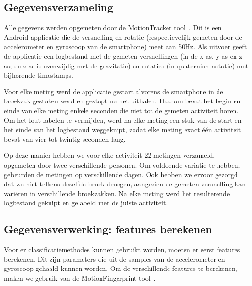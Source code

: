 \documentclass{article}
\begin{document}
\subsection{Gegevensverzameling}

Alle gegevens werden opgemeten door de MotionTracker tool~\cite{meert and schietgat:motiontracker}.
Dit is een Android-applicatie die de versnelling en rotatie (respectievelijk gemeten door de accelerometer en gyroscoop van de smartphone) meet aan 50Hz.  Als uitvoer geeft de applicatie een logbestand met de gemeten versnellingen (in de x-as, y-as en z-as; de z-as is evenwijdig met de gravitatie) en rotaties (in quaternion notatie) met bijhorende timestamps.

Voor elke meting werd de applicatie gestart alvorens de smartphone in de broekzak gestoken werd en gestopt na het uithalen. Daarom bevat het begin en einde van elke meting enkele seconden die niet tot de gemeten activiteit horen. Om het fout labelen te vermijden, werd na elke meting een stuk van de start en het einde van het logbestand weggeknipt, zodat elke meting exact \'e\'en activiteit bevat van vier tot twintig seconden lang. 

Op deze manier hebben we voor elke activiteit 22 metingen verzameld, opgemeten door twee verschillende personen. Om voldoende variatie te hebben, gebeurden de metingen op verschillende dagen. Ook hebben we ervoor gezorgd dat we niet telkens dezelfde broek droegen, aangezien de gemeten versnelling kan vari\"eren in verschillende broekzakken. Na elke meting werd het resulterende logbestand geknipt en gelabeld met de juiste activiteit.


\subsection{Gegevensverwerking: features berekenen}

Voor er classificatiemethodes kunnen gebruikt worden, moeten er eerst features berekenen. Dit zijn parameters die uit de samples van de accelerometer en gyroscoop gehaald kunnen worden. Om de verschillende features te berekenen, maken we gebruik van de MotionFingerprint tool~\cite{meert and schietgat:motionfingerprint}. %


\end{document}
